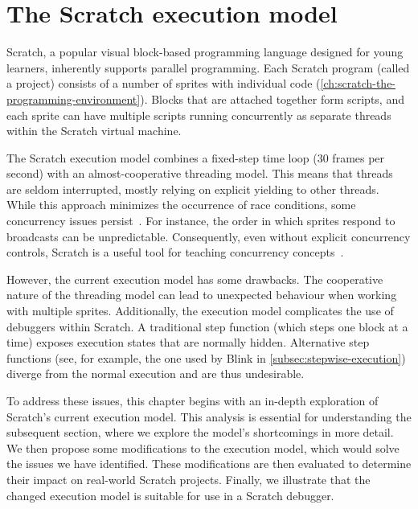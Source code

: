 \documentclass[../main]{subfiles}
\begin{document}
\chapter{The Scratch execution model}\label{ch:scratch-execution-model}


Scratch, a popular visual block-based programming language designed for young learners, inherently supports parallel programming.
Each Scratch program (called a project) consists of a number of sprites with individual code (\cref{ch:scratch-the-programming-environment}).
Blocks that are attached together form scripts, and each sprite can have multiple scripts running concurrently as separate threads within the Scratch virtual machine.

The Scratch execution model combines a fixed-step time loop (30 frames per second) with an almost-cooperative threading model.
This means that threads are seldom interrupted, mostly relying on explicit yielding to other threads.
While this approach minimizes the occurrence of race conditions, some concurrency issues persist~\autocite{maloneyScratchProgrammingLanguage2010}.
For instance, the order in which sprites respond to broadcasts can be unpredictable.
Consequently, even without explicit concurrency controls, Scratch is a useful tool for teaching concurrency concepts~\autocite{fatourouTeachingConcurrentProgramming2018}.

However, the current execution model has some drawbacks.
The cooperative nature of the threading model can lead to unexpected behaviour when working with multiple sprites.
Additionally, the execution model complicates the use of debuggers within Scratch.
A traditional step function (which steps one block at a time) exposes execution states that are normally hidden.
Alternative step functions (see, for example, the one used by Blink in \cref{subsec:stepwise-execution}) diverge from the normal execution and are thus undesirable.

To address these issues, this chapter begins with an in-depth exploration of Scratch's current execution model.
This analysis is essential for understanding the subsequent section, where we explore the model's shortcomings in more detail.
We then propose some modifications to the execution model, which would solve the issues we have identified.
These modifications are then evaluated to determine their impact on real-world Scratch projects.
Finally, we illustrate that the changed execution model is suitable for use in a Scratch debugger.
\end{document}
